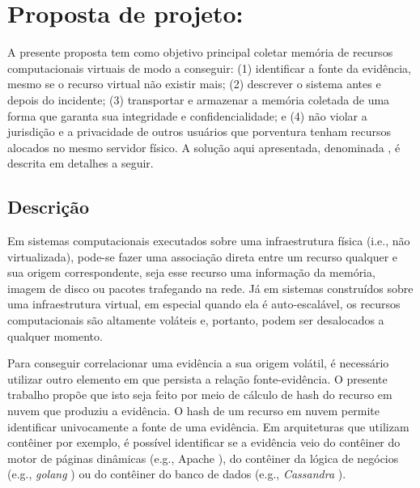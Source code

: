 \chapter{Proposta de projeto: \fancyname}
\label{chp:proposta}

A presente proposta tem como objetivo principal coletar memória de recursos computacionais virtuais de modo a conseguir: 
(1) identificar a fonte da evidência, mesmo se o recurso virtual não existir mais; 
(2) descrever o sistema antes e depois do incidente;
(3) transportar e armazenar a memória coletada de uma forma que garanta sua integridade e confidencialidade; e
(4) não violar a jurisdição e a privacidade de outros usuários que porventura tenham recursos alocados no mesmo servidor físico.
%
A solução aqui apresentada, denominada \fancyname, é descrita em detalhes a seguir.

\section{Descrição}
\label{sec:proposta-desc}

Em sistemas computacionais executados sobre uma infraestrutura física (i.e., não virtualizada), pode-se fazer uma associação direta entre um recurso qualquer e sua origem correspondente, seja esse recurso uma informação da memória, imagem de disco ou pacotes trafegando na rede.
%
Já em sistemas construídos sobre uma infraestrutura virtual, em especial quando ela é auto-escalável, os recursos computacionais são altamente voláteis e, portanto, podem ser desalocados a qualquer momento.


Para conseguir correlacionar uma evidência a sua origem volátil, é necessário utilizar outro elemento em que persista a relação fonte-evidência.
%
O presente trabalho propõe que isto seja feito por meio de cálculo de hash do recurso em nuvem que produziu a evidência. %
%
%
O hash de um recurso em nuvem permite identificar univocamente a fonte de uma evidência. Em arquiteturas que utilizam contêiner por exemplo, é possível identificar se a evidência veio do contêiner do motor de páginas dinâmicas (e.g., Apache%
), do contêiner da lógica de negócios (e.g., \textit{golang}%
) ou do contêiner do banco de dados (e.g., \textit{Cassandra}%
). %

